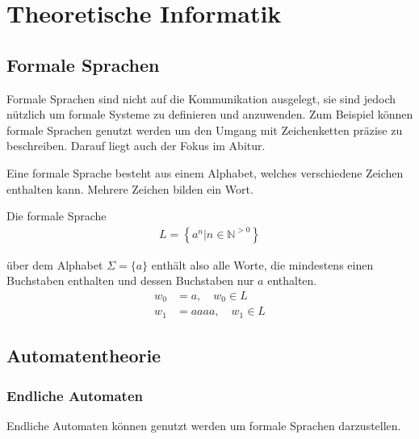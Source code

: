 \chapter{Theoretische Informatik}
\section{Formale Sprachen}
\begin{flushleft}
Formale Sprachen sind nicht auf die Kommunikation ausgelegt,
sie sind jedoch nützlich um formale Systeme zu definieren und anzuwenden.
Zum Beispiel können formale Sprachen genutzt werden um den Umgang mit
Zeichenketten präzise zu beschreiben.
Darauf liegt auch der Fokus im Abitur.

Eine formale Sprache besteht aus einem Alphabet, welches verschiedene Zeichen
enthalten kann. Mehrere Zeichen bilden ein Wort.
\end{flushleft}

\begin{flushleft}
Die formale Sprache
\begin{align}
    L=\left\{a^n|n\in\mathbb{N}^{>0}\right\}
\end{align}

über dem Alphabet $\Sigma=\{a\}$ enthält also alle Worte,
die mindestens einen Buchstaben enthalten und dessen Buchstaben
nur $a$ enthalten.
\begin{align}
    w_0&=a,\quad w_0\in L \\
    w_1&=aaaa,\quad w_1\in L
\end{align}
\end{flushleft}

\section{Automatentheorie}
\subsection{Endliche Automaten}
\begin{flushleft}
Endliche Automaten können genutzt werden um formale Sprachen darzustellen.
\end{flushleft}

